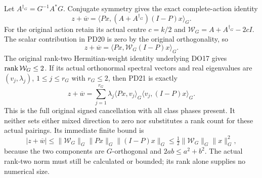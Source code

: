 \documentclass[11pt]{article}
\begin{document}
Let $A^{\dagger_G}=G^{-1}A^*G$.  Conjugate symmetry gives the exact
complete-action identity
\[
 \boxed{z+\overline w
       =\langle Px,(A+A^{\dagger_G})(I-P)x\rangle_G.}            \tag{PD20}
\]
For the original action retain its actual centre $c=k/2$ and
$\mathcal W_G=A+A^{\dagger_G}-2cI$.  The scalar contribution in
PD20 is zero by the original orthogonality, so
\[
 z+\overline w=\langle Px,\mathcal W_G(I-P)x\rangle_G.           \tag{PD21}
\]
The original rank-two Hermitian-weight identity underlying DO17 \cite{mproj:DO}
gives $\operatorname{rank}\mathcal W_G\le2$.  If its actual orthonormal spectral
vectors and real eigenvalues are $(v_j,\lambda_j)$, $1\le j\le r_G$
with $r_G\le2$, then PD21 is exactly
\[
 z+\overline w
   =\sum_{j=1}^{r_G}\lambda_j
       \langle Px,v_j\rangle_G\langle v_j,(I-P)x\rangle_G.        \tag{PD22}
\]
This is the full original signed cancellation with all class phases
present.  It neither sets either mixed direction to zero nor
substitutes a rank count for these actual pairings.  Its immediate
finite bound is
\[
 |z+\overline w|
 \le\|\mathcal W_G\|_G\|Px\|_G\|(I-P)x\|_G
 \le\tfrac12\|\mathcal W_G\|_G\|x\|_G^2,                      \tag{PD23}
\]
because the two components are $G$-orthogonal and
$2ab\le a^2+b^2$.  The actual rank-two norm must still be
calculated or bounded; its rank alone supplies no numerical size.
\end{document}
